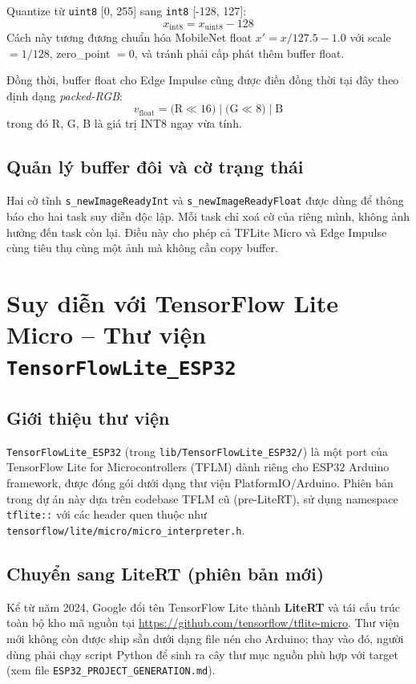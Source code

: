 \documentclass[12pt,a4paper]{article}
\begin{document}
Quantize từ \texttt{uint8} [0, 255] sang \texttt{int8} [-128, 127]:
\[
  x_{\text{int8}} = x_{\text{uint8}} - 128
\]
Cách này tương đương chuẩn hóa MobileNet float $x' = x/127.5 - 1.0$ với scale $= 1/128$, zero\_point $= 0$, và tránh phải cấp phát thêm buffer float.

Đồng thời, buffer float cho Edge Impulse cũng được điền đồng thời tại đây theo định dạng \emph{packed-RGB}:
\[
  v_{\text{float}} = \text{(R} \ll 16) \mid \text{(G} \ll 8) \mid \text{B}
\]
trong đó R, G, B là giá trị INT8 ngay vừa tính.

\subsection{Quản lý buffer đôi và cờ trạng thái}

Hai cờ tĩnh \texttt{s\_newImageReadyInt} và \texttt{s\_newImageReadyFloat} được dùng để thông báo cho hai task suy diễn độc lập. Mỗi task chỉ xoá cờ của riêng mình, không ảnh hưởng đến task còn lại. Điều này cho phép cả TFLite Micro và Edge Impulse cùng tiêu thụ cùng một ảnh mà không cần copy buffer.

\section{Suy diễn với TensorFlow Lite Micro -- Thư viện \texttt{TensorFlowLite\_ESP32}}

\subsection{Giới thiệu thư viện}

\texttt{TensorFlowLite\_ESP32} (trong \texttt{lib/TensorFlowLite\_ESP32/}) là một port của TensorFlow Lite for Microcontrollers (TFLM) dành riêng cho ESP32 Arduino framework, được đóng gói dưới dạng thư viện PlatformIO/Arduino. Phiên bản trong dự án này dựa trên codebase TFLM cũ (pre-LiteRT), sử dụng namespace \texttt{tflite::} với các header quen thuộc như \texttt{tensorflow/lite/micro/micro\_interpreter.h}.

\subsection{Chuyển sang LiteRT (phiên bản mới)}

Kể từ năm 2024, Google đổi tên TensorFlow Lite thành \textbf{LiteRT} và tái cấu trúc toàn bộ kho mã nguồn tại \url{https://github.com/tensorflow/tflite-micro}. Thư viện mới không còn được ship sẵn dưới dạng file nén cho Arduino; thay vào đó, người dùng phải chạy script Python để sinh ra cây thư mục nguồn phù hợp với target (xem file \texttt{ESP32\_PROJECT\_GENERATION.md}).
\end{document}
